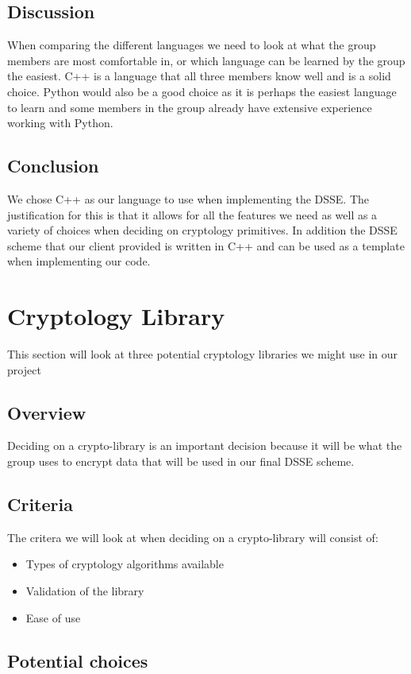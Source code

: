 \subsection{Discussion}     
When comparing the different languages we need to look at what the group members are most comfortable in, or which language can be learned by the group the easiest. C++ is a language that all three members know well and is a solid choice. Python would also be a good choice as it is perhaps the easiest language to learn and some members in the group already have extensive experience working with Python.   

\subsection{Conclusion}
We chose C++ as our language to use when implementing the DSSE. The justification for this is that it allows for all the features we need as well as a variety of choices when deciding on cryptology primitives. In addition the DSSE scheme that our client provided is written in C++ and can be used as a template when implementing our code. 


\section{ Cryptology Library }
This section will look at three potential cryptology libraries we might use in our project 

\subsection{ Overview }
Deciding on a crypto-library is an important decision because it will be what the group uses to encrypt data that will be used in our final DSSE scheme. 

\subsection{ Criteria }
The critera we will look at when deciding on a crypto-library will consist of: \\
\begin{itemize}
\item Types of cryptology algorithms available
\item Validation of the library
\item Ease of use
\end{itemize}

\subsection{ Potential choices }
